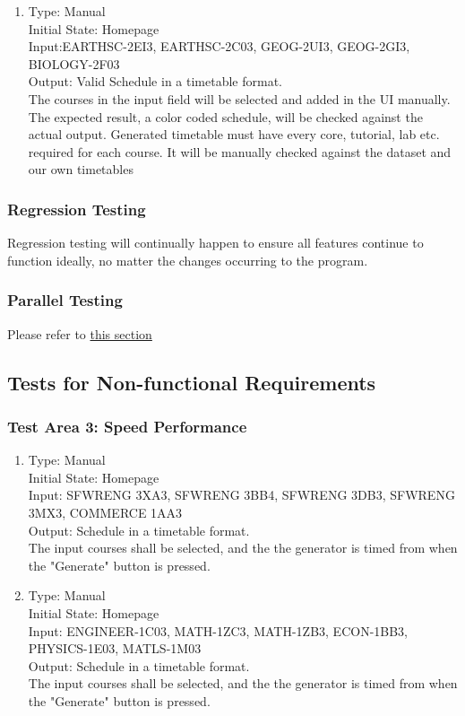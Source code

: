\documentclass[11pt, oneside]{article}   	%
\begin{document}
\begin{enumerate}
\item Type: Manual \\
Initial State: Homepage \\
Input:EARTHSC-2EI3, EARTHSC-2C03, GEOG-2UI3, GEOG-2GI3, BIOLOGY-2F03\\
Output: Valid Schedule in a timetable format. \\
The courses in the input field will be selected and added in the UI manually. The expected result, a color coded schedule, will be checked against the actual output. Generated timetable must have every core, tutorial, lab etc. required for each course. It will be manually checked against the dataset and our own timetables \\
\end{enumerate}

\subsubsection{Regression Testing}
Regression testing will continually happen to ensure all features continue to function ideally, no matter the changes occurring to the program.

\subsubsection{Parallel Testing}
Please refer to \hyperref[sec:compare]{this section}

\subsection{Tests for Non-functional Requirements}
\subsubsection{Test Area 3: Speed Performance}
\begin{enumerate}

\item Type: Manual \\
Initial State: Homepage \\
Input: SFWRENG 3XA3, SFWRENG 3BB4, SFWRENG 3DB3, SFWRENG 3MX3, COMMERCE 1AA3 \\
Output: Schedule in a timetable format. \\
The input courses shall be selected, and the the generator is timed from when the "Generate" button is pressed. \\

\item Type: Manual \\
Initial State: Homepage \\
Input:  ENGINEER-1C03, MATH-1ZC3, MATH-1ZB3,  ECON-1BB3, PHYSICS-1E03, MATLS-1M03 \\
Output: Schedule in a timetable format. \\
The input courses shall be selected, and the the generator is timed from when the "Generate" button is pressed.  \\
\end{enumerate}
\end{document}
